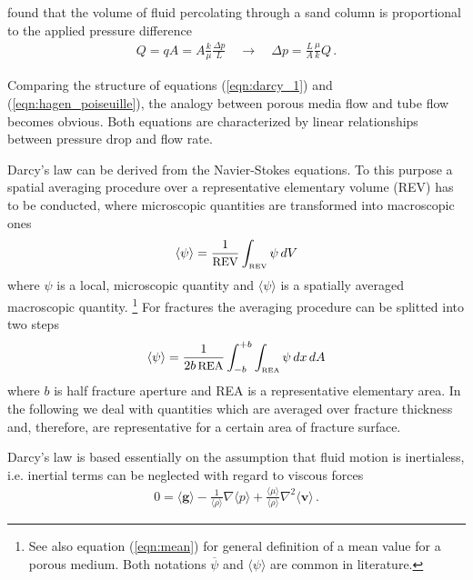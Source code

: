 \cite{Dar:56} found that the volume of fluid percolating through a
sand column is proportional to the applied pressure
difference
\begin{eqnarray}
Q
=
q A
=
A
\frac{k}{\mu}
\frac{\Delta p}{L}
\quad \rightarrow \quad
\Delta p
=
\frac{L}{A}
\frac{\mu}{k}
Q
\, .
\label{eqn:darcy_1}
\end{eqnarray}

Comparing the structure of equations
(\ref{eqn:darcy_1}) and  (\ref{eqn:hagen_poiseuille}),
the analogy between porous media flow and tube flow becomes obvious.
Both equations are characterized by linear relationships
between pressure drop and flow rate.

Darcy's law can be derived from the Navier-Stokes equations. To
this purpose a spatial averaging procedure over a representative
elementary volume (REV) has to be conducted, where microscopic
quantities are transformed into macroscopic ones \cite{Die:85}
\begin{eqnarray}
\langle \psi \rangle
=
\frac{1}{\mbox{\small REV}}
\int_{\mbox{\tiny REV}}
\psi
\, dV
\end{eqnarray}
where
$\psi$ is a local, microscopic quantity
and
$\langle \psi \rangle$ is a spatially averaged macroscopic quantity.
\footnote{See also equation (\ref{eqn:mean}) for general definition of a mean value for a porous medium.
Both notations $\overline \psi$ and $\langle \psi \rangle$ are common in literature.}
%
For fractures the averaging procedure can be splitted into two steps
\begin{eqnarray}
\langle \psi \rangle
=
\frac{1}{2b \, \mbox{\small REA}}
\int_{-b}^{+b}
\int_{\mbox{\tiny REA}}
\psi
\, dx \, dA
\label{eqn:averaging_fracs}
\end{eqnarray}
where $b$ is half fracture aperture and REA is a representative
elementary area. In the following we deal with quantities which
are averaged over fracture thickness and, therefore, are
representative for a certain area of fracture surface.

Darcy's law
is based essentially on the assumption that fluid motion is inertialess,
i.e. inertial terms can be neglected with regard to viscous forces
\begin{eqnarray}
0
=
\langle\mathbf{g}\rangle
-
\frac {1}{\langle\rho\rangle}
\nabla \langle p \rangle
+
\frac{\langle\mu\rangle}{\langle\rho\rangle}
\nabla^2 {\langle\mathbf{v}\rangle}
\, .
\label{eqn:darcy_2}
\end{eqnarray}

